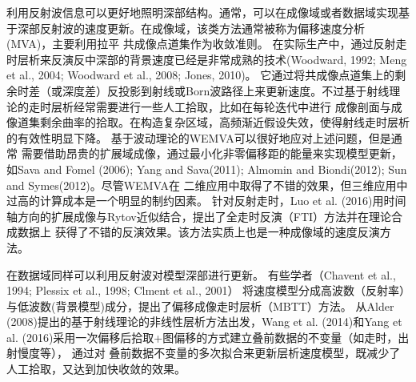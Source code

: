 利用反射波信息可以更好地照明深部结构。通常，可以在成像域或者数据域实现基于深部反射波的速度更新。在成像域，该类方法通常被称为偏移速度分析(MVA)，主要利用拉平
共成像点道集作为收敛准则。
在实际生产中，通过反射走时层析来反演反中深部的背景速度已经是非常成熟的技术(Woodward,
1992\cite{Woodward1992}; Meng et al., 2004\cite{MengEtAl2004}; Woodward et al., 2008\cite{
Woodward2008}; Jones, 2010\cite{Jones2010})。
它通过将共成像点道集上的剩余时差（或深度差）反投影到射线或Born波路径上来更新速度。不过基于射线理论的走时层析经常需要进行一些人工拾取，比如在每轮迭代中进行
成像剖面与成像道集剩余曲率的拾取。在构造复杂区域，高频渐近假设失效，使得射线走时层析的有效性明显下降。
基于波动理论的WEMVA可以很好地应对上述问题，但是通常
需要借助昂贵的扩展域成像，通过最小化非零偏移距的能量来实现模型更新，如Sava and
Fomel (2006)\cite{SavaEtAl2006}; Yang and Sava(2011)\cite{YangEtAl2011}; Almomin and
Biondi(2012)\cite{Almomin2012}; Sun and Symes(2012)\cite{SunEtAl2012}。尽管WEMVA在
二维应用中取得了不错的效果，但三维应用中过高的计算成本是一个明显的制约因素。
针对反射走时，Luo et
al. (2016)\cite{Luo2016}用时间轴方向的扩展成像与Rytov近似结合，提出了全走时反演（FTI）方法并在理论合成数据上
获得了不错的反演效果。该方法实质上也是一种成像域的速度反演方法。

在数据域同样可以利用反射波对模型深部进行更新。
有些学者（Chavent et al., 1994\cite{ChaventEtAl1994}; Plessix et al., 1998\cite{PlessixEtAl1998}; Clment et al., 2001\cite{ClementEtAl2001}）
将速度模型分成高波数（反射率）与低波数(背景模型)成分，提出了偏移成像走时层析（MBTT）方法。
从Alder (2008)\cite{Adler2008}提出的基于射线理论的非线性层析方法出发，Wang
et al. (2014)\cite{WangEtAl2014}和Yang et al.
(2016)\cite{YangEtAl2016}采用一次偏移后拾取+图偏移的方式建立叠前数据的不变量（如走时，出射慢度等），
通过对
叠前数据不变量的多次拟合来更新层析速度模型，既减少了人工拾取，又达到加快收敛的效果。

